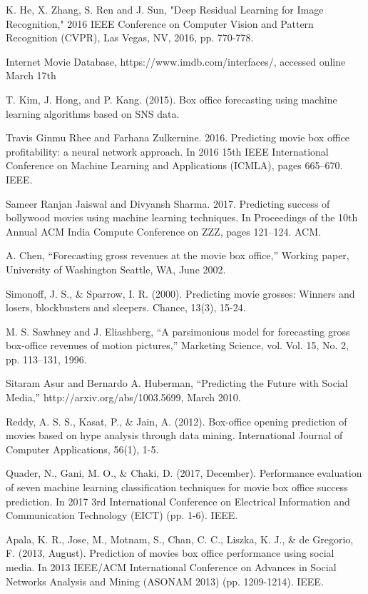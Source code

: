 {\begin{thebibliography}{25}
K. He, X. Zhang, S. Ren and J. Sun, "Deep Residual Learning for Image Recognition," 2016 IEEE Conference on Computer Vision and Pattern Recognition (CVPR), Las Vegas, NV, 2016, pp. 770-778.

Internet Movie Database, https://www.imdb.com/interfaces/, accessed online March 17th

T. Kim, J. Hong, and P. Kang. (2015). Box office forecasting using machine learning algorithms based on SNS data.

Travis Ginmu Rhee and Farhana Zulkernine. 2016. Predicting movie box office profitability: a neural network approach. In 2016 15th IEEE International Conference on Machine Learning and Applications (ICMLA), pages 665–670. IEEE.

Sameer Ranjan Jaiswal and Divyansh Sharma. 2017. Predicting success of bollywood movies using machine learning techniques. In Proceedings of the 10th Annual ACM India Compute Conference on ZZZ, pages 121–124. ACM.

A. Chen, “Forecasting gross revenues at the movie box office,” Working paper, University of Washington Seattle, WA, June 2002.
 
Simonoff, J. S., \& Sparrow, I. R. (2000). Predicting movie grosses: Winners and losers, blockbusters and sleepers. Chance, 13(3), 15-24.

M. S. Sawhney and J. Eliashberg, “A parsimonious model for forecasting gross box-office revenues of motion
pictures,” Marketing Science, vol. Vol. 15, No. 2, pp.
113–131, 1996.

Sitaram Asur and Bernardo A. Huberman, “Predicting the Future with Social Media,” http://arxiv.org/abs/1003.5699, March 2010.

Reddy, A. S. S., Kasat, P., \& Jain, A. (2012). Box-office opening prediction of movies based on hype analysis through data mining. International Journal of Computer Applications, 56(1), 1-5.

Quader, N., Gani, M. O., \& Chaki, D. (2017, December). Performance evaluation of seven machine learning classification techniques for movie box office success prediction. In 2017 3rd International Conference on Electrical Information and Communication Technology (EICT) (pp. 1-6). IEEE.

Apala, K. R., Jose, M., Motnam, S., Chan, C. C., Liszka, K. J., \& de Gregorio, F. (2013, August). Prediction of movies box office performance using social media. In 2013 IEEE/ACM International Conference on Advances in Social Networks Analysis and Mining (ASONAM 2013) (pp. 1209-1214). IEEE.


\end{thebibliography}}
